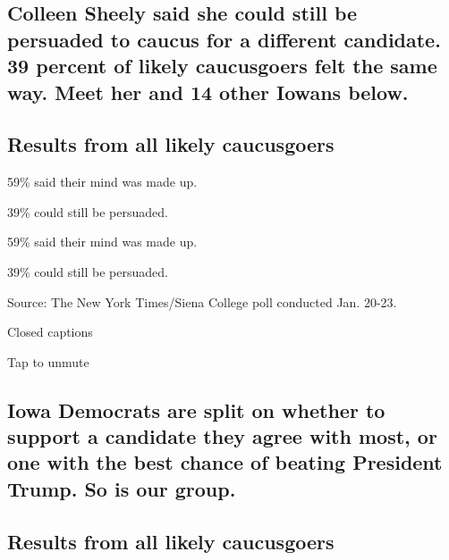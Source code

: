 \hypertarget{colleen-sheely-said-she-could-still-be-persuaded-to-caucus-for-a-different-candidate-39-percent-of-likely-caucusgoers-felt-the-same-way-meet-her-and-14-other-iowans-below}{%
\subsection{Colleen Sheely said she could still be persuaded to caucus
for a different candidate. 39 percent of likely caucusgoers felt the
same way. Meet her and 14 other Iowans
below.}\label{colleen-sheely-said-she-could-still-be-persuaded-to-caucus-for-a-different-candidate-39-percent-of-likely-caucusgoers-felt-the-same-way-meet-her-and-14-other-iowans-below}}

\hypertarget{results-from-all-likely-caucusgoers}{%
\subsection{Results from all likely
caucusgoers}\label{results-from-all-likely-caucusgoers}}

59\% said their mind was made up.

39\% could still be persuaded.

59\% said their mind was made up.

39\% could still be persuaded.

Source: The New York Times/Siena College poll conducted Jan. 20-23.

Closed captions

Tap to unmute

\hypertarget{iowa-democrats-are-split-on-whether-to-support-a-candidate-they-agree-with-most-or-one-with-the-best-chance-of-beating-president-trump-so-is-our-group}{%
\subsection{Iowa Democrats are split on whether to support a candidate
they agree with most, or one with the best chance of beating President
Trump. So is our
group.}\label{iowa-democrats-are-split-on-whether-to-support-a-candidate-they-agree-with-most-or-one-with-the-best-chance-of-beating-president-trump-so-is-our-group}}

\hypertarget{results-from-all-likely-caucusgoers-1}{%
\subsection{Results from all likely
caucusgoers}\label{results-from-all-likely-caucusgoers-1}}

